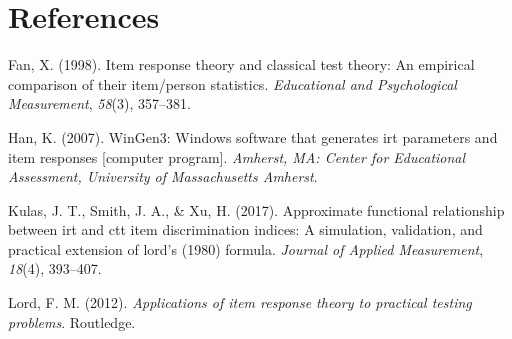 \documentclass[
  english,
  man,floatsintext]{apa6}
\begin{document}
\newpage

\hypertarget{references}{%
\section{References}\label{references}}

\begingroup
\setlength{\parindent}{-0.5in}
\setlength{\leftskip}{0.5in}

\hypertarget{refs}{}
\leavevmode\hypertarget{ref-fan1998item}{}%
Fan, X. (1998). Item response theory and classical test theory: An empirical comparison of their item/person statistics. \emph{Educational and Psychological Measurement}, \emph{58}(3), 357--381.

\leavevmode\hypertarget{ref-han2007wingen3}{}%
Han, K. (2007). WinGen3: Windows software that generates irt parameters and item responses {[}computer program{]}. \emph{Amherst, MA: Center for Educational Assessment, University of Massachusetts Amherst}.

\leavevmode\hypertarget{ref-kulas2017approximate}{}%
Kulas, J. T., Smith, J. A., \& Xu, H. (2017). Approximate functional relationship between irt and ctt item discrimination indices: A simulation, validation, and practical extension of lord's (1980) formula. \emph{Journal of Applied Measurement}, \emph{18}(4), 393--407.

\leavevmode\hypertarget{ref-lord2012applications}{}%
Lord, F. M. (2012). \emph{Applications of item response theory to practical testing problems}. Routledge.

\endgroup
\end{document}

